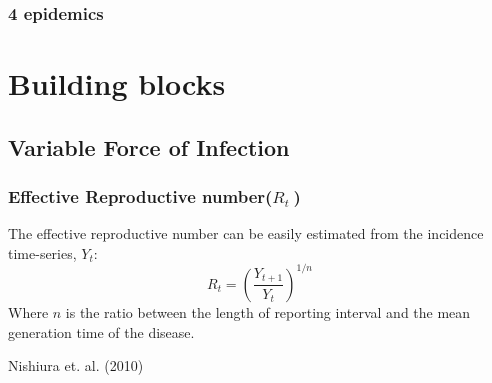 \documentclass[10pt,compress,notheorems]{beamer}
\def \rr {$R_{t}\:$}
\begin{document}
\begin{frame}[fragile]
\frametitle{4 epidemics}
\begin{flushleft}
 \begin{figure}
  \end{figure}
\end{flushleft}

\end{frame}

\section{Building blocks}

\subsection{Variable Force of Infection}
\begin{frame}
\frametitle{Effective Reproductive number(\rr)}
The effective reproductive number can be easily estimated from the incidence 
time-series, $Y_t$:
\begin{equation}
\label{eq:Rtestimate}
R_t = \left( \frac{Y_{t+1}}{Y_t}\right)^{1/n}
\end{equation}
Where $n$ is the ratio between the length of reporting interval and 
the mean generation time of the disease.
\begin{flushright}
 Nishiura et. al. (2010)
\end{flushright}
\end{frame}
\end{document}
